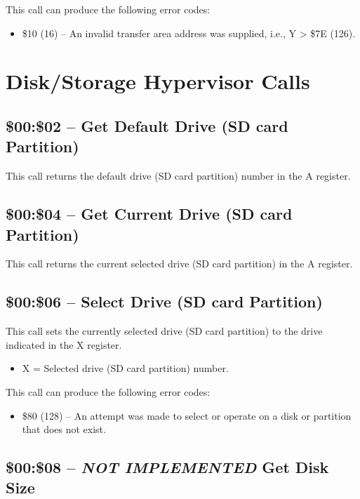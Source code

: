 This call can produce the following error codes:

\begin{itemize}
\item \$10 (16) -- An invalid transfer area address was supplied, i.e., Y > \$7E (126).
\end{itemize}

\section{Disk/Storage Hypervisor Calls}

\subsection{\$00:\$02 -- Get Default Drive (SD card Partition)}

This call returns the default drive (SD card partition) number in the A register.

\subsection{\$00:\$04 -- Get Current Drive (SD card Partition)}

This call returns the current selected drive (SD card partition) in the A register.

\subsection{\$00:\$06 -- Select Drive (SD card Partition)}

This call sets the currently selected drive (SD card partition) to the drive indicated in the X register.

\begin{itemize}
  \item X = Selected drive (SD card partition) number.
\end{itemize}

This call can produce the following error codes:

\begin{itemize}
\item \$80 (128) -- An attempt was made to select or operate on a disk or partition that does not exist.
\end{itemize}

\subsection{\$00:\$08 -- {\em NOT IMPLEMENTED} Get Disk Size}


